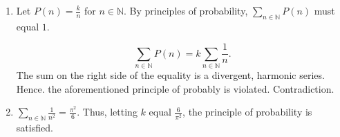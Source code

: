 \begin{enumerate}[label=(\alph*)]
\item Let $P(n) = \frac{k}{n}$ for $n \in \mathbb{N}$. By principles of
probability, $\sum_{n \in \mathbb{N}}P(n)$ must equal $1$.

$$\sum_{n \in \mathbb{N}}P(n) = k\sum_{n \in \mathbb{N}}\frac{1}{n}.$$ The sum
on the right side of the equality is a divergent, harmonic series. Hence. the
aforementioned principle of probably is violated. Contradiction.

\item $\sum_{n \in \mathbb{N}}\frac{1}{n^{2}} = \frac{\pi^{2}}{6}$. Thus,
letting $k$ equal $\frac{6}{\pi^{2}}$, the principle of probability is
satisfied.

\end{enumerate}